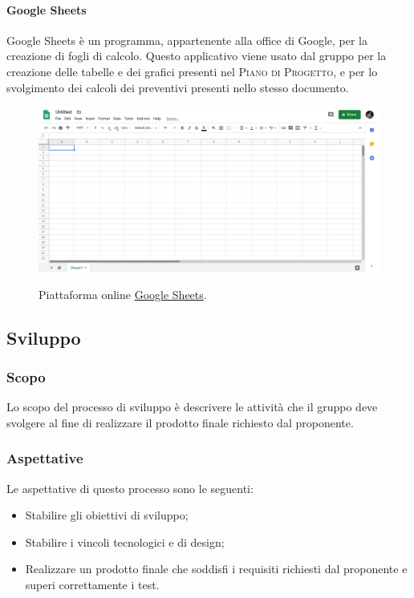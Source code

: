 \documentclass[../norme-di-progetto.tex]{subfiles}
\begin{document}
\paragraph{Google Sheets}
Google Sheets è un programma, appartenente alla  office di Google, per la creazione di fogli di calcolo. Questo applicativo viene usato dal gruppo per la creazione delle tabelle e dei grafici presenti nel \textsc{Piano di Progetto}, e per lo svolgimento dei calcoli dei preventivi presenti nello stesso documento.

\begin{figure}[H]
  \centering
  \includegraphics[width=15cm]{img/sheets.png}
  \label{fig:sheets}
  \caption{Piattaforma online \href{https://docs.google.com/spreadsheets/u/0/}{Google Sheets}.}
\end{figure}

\subsection{Sviluppo}

\subsubsection{Scopo}
Lo scopo del processo di sviluppo è descrivere le attività che il gruppo deve svolgere al fine di realizzare il prodotto finale richiesto dal proponente.

\subsubsection{Aspettative}
Le aspettative di questo processo sono le seguenti:
\begin{itemize}
  \item Stabilire gli obiettivi di sviluppo;
  \item Stabilire i vincoli tecnologici e di design;
  \item Realizzare un prodotto finale che soddisfi i requisiti richiesti dal proponente e superi correttamente i test.
\end{itemize}
\end{document}
